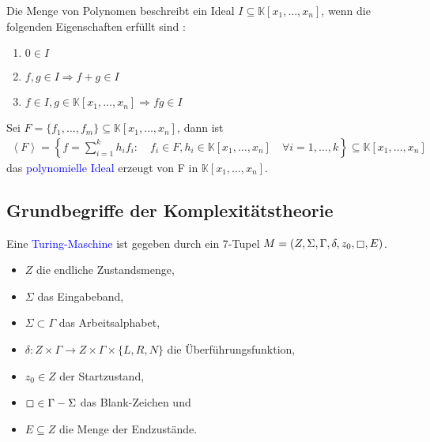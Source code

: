 \begin{definition}
Die Menge von Polynomen beschreibt ein Ideal $I \subseteq \mathbb{K}[x_1,\ldots,x_n]$, wenn die folgenden Eigenschaften erfüllt sind \cite{Ausgangsartikel}:
\begin{enumerate}
\item $0 \in I$
\item $f,g \in I \Rightarrow f+g \in I$
\item $f \in I, g \in \mathbb{K}[x_1,\ldots,x_n] \Rightarrow fg \in I$
\end{enumerate}
Sei $F = \{f_1,\ldots,f_m\} \subseteq \mathbb{K}[x_1,\ldots,x_n]$, dann ist
\begin{align*}
\left\langle F \right\rangle = \left\{f = \sum_{i=1}^k h_if_i: \quad f_i \in F, h_i \in \mathbb{K}[x_1,\ldots,x_n] \quad \forall i = 1,\ldots,k\right\} \subseteq \mathbb{K}[x_1,\ldots,x_n]
\end{align*}
das \textcolor{blue}{polynomielle Ideal} erzeugt von F in $\mathbb{K}[x_1,\ldots,x_n]$.
\end{definition}


\subsection{Grundbegriffe der Komplexitätstheorie}

\begin{definition}
Eine \textcolor{blue}{Turing-Maschine} ist gegeben durch ein 7-Tupel $M =(Z,\Sigma,\Gamma,\delta,z_0,\boxempty,E)$.
\begin{itemize}
\item $Z$ die endliche Zustandsmenge,
\item $\Sigma$ das Eingabeband,
\item $\Sigma \subset \Gamma$ das Arbeitsalphabet,
\item $\delta: Z \times \Gamma \rightarrow Z \times \Gamma \times \{L,R,N\}$ die Überführungsfunktion,
\item $z_0 \in Z$ der Startzustand,
\item $\boxempty \in \Gamma - \Sigma$ das Blank-Zeichen und 
\item $E \subseteq Z$ die Menge der Endzustände.
\end{itemize}
\end{definition}

